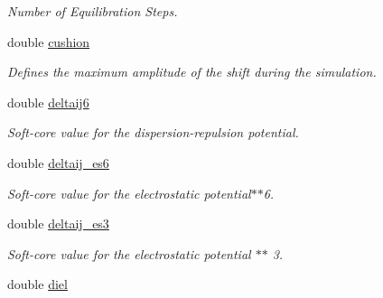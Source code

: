 \begin{DoxyCompactItemize}
\begin{DoxyCompactList}\small\item\em Number of Equilibration Steps. \item\end{DoxyCompactList}\item 
\hypertarget{classPARSER_ab41ceabcb019466b1807c6da5a34119c}{
double \hyperlink{classPARSER_ab41ceabcb019466b1807c6da5a34119c}{cushion}}
\label{classPARSER_ab41ceabcb019466b1807c6da5a34119c}

\begin{DoxyCompactList}\small\item\em Defines the maximum amplitude of the shift during the simulation. \item\end{DoxyCompactList}\item 
\hypertarget{classPARSER_a3c6e2cdfc52f7c600e6809a15e2ee7a1}{
double \hyperlink{classPARSER_a3c6e2cdfc52f7c600e6809a15e2ee7a1}{deltaij6}}
\label{classPARSER_a3c6e2cdfc52f7c600e6809a15e2ee7a1}

\begin{DoxyCompactList}\small\item\em Soft-\/core value for the dispersion-\/repulsion potential. \item\end{DoxyCompactList}\item 
\hypertarget{classPARSER_a9fb6fab6eb473c5cf76b05f23f5b7c8d}{
double \hyperlink{classPARSER_a9fb6fab6eb473c5cf76b05f23f5b7c8d}{deltaij\_\-es6}}
\label{classPARSER_a9fb6fab6eb473c5cf76b05f23f5b7c8d}

\begin{DoxyCompactList}\small\item\em Soft-\/core value for the electrostatic potential$\ast$$\ast$6. \item\end{DoxyCompactList}\item 
\hypertarget{classPARSER_a595542a8b5bcafc6d6b7c1e4db1727ef}{
double \hyperlink{classPARSER_a595542a8b5bcafc6d6b7c1e4db1727ef}{deltaij\_\-es3}}
\label{classPARSER_a595542a8b5bcafc6d6b7c1e4db1727ef}

\begin{DoxyCompactList}\small\item\em Soft-\/core value for the electrostatic potential $\ast$$\ast$ 3. \item\end{DoxyCompactList}\item 
\hypertarget{classPARSER_a810e7958f2e04522e6915962a9f1e3d9}{
double \hyperlink{classPARSER_a810e7958f2e04522e6915962a9f1e3d9}{diel}}
\label{classPARSER_a810e7958f2e04522e6915962a9f1e3d9}


\end{DoxyCompactItemize}
